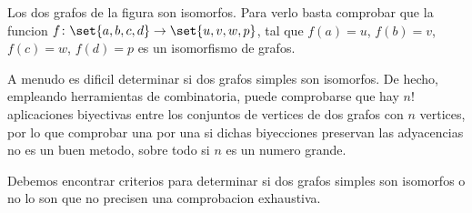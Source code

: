 \begin{example}
	Los dos grafos de la figura son isomorfos. Para verlo basta comprobar que la funcion \(f\colon \set{a,b,c,d} \to \set{u,v,w,p }\), tal que \(f(a) = u \), \(f(b) = v \), \(f(c) = w \), \(f(d) = p \) es un isomorfismo de grafos.

	\begin{center}
	\end{center}
\end{example}

A menudo es dificil determinar si dos grafos simples son isomorfos. De hecho, empleando herramientas de combinatoria, puede comprobarse que hay \(n! \) aplicaciones biyectivas entre los conjuntos de vertices de dos grafos con \(n \) vertices, por lo que comprobar una por una si dichas biyecciones preservan las adyacencias no es un buen metodo, sobre todo si \(n \) es un numero grande.

Debemos encontrar criterios para determinar si dos grafos simples son isomorfos o no lo son que no precisen una comprobacion exhaustiva.

